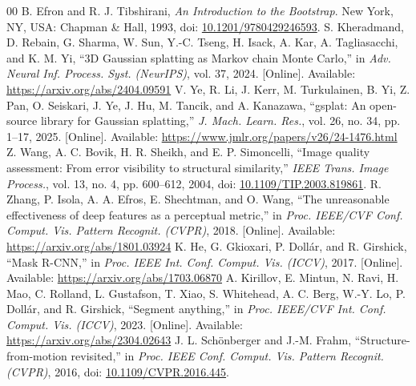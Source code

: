 \begin{thebibliography}{00}
 B. Efron and R. J. Tibshirani, \textit{An Introduction to the Bootstrap}. New York, NY, USA: Chapman \& Hall, 1993, doi: \href{https://doi.org/10.1201/9780429246593}{10.1201/9780429246593}.
 S. Kheradmand, D. Rebain, G. Sharma, W. Sun, Y.-C. Tseng, H. Isack, A. Kar, A. Tagliasacchi, and K. M. Yi, ``3D Gaussian splatting as Markov chain Monte Carlo,'' in \textit{Adv. Neural Inf. Process. Syst. (NeurIPS)}, vol. 37, 2024. [Online]. Available: \url{https://arxiv.org/abs/2404.09591}
 V. Ye, R. Li, J. Kerr, M. Turkulainen, B. Yi, Z. Pan, O. Seiskari, J. Ye, J. Hu, M. Tancik, and A. Kanazawa, ``gsplat: An open-source library for Gaussian splatting,'' \textit{J. Mach. Learn. Res.}, vol. 26, no. 34, pp. 1--17, 2025. [Online]. Available: \url{https://www.jmlr.org/papers/v26/24-1476.html}
 Z. Wang, A. C. Bovik, H. R. Sheikh, and E. P. Simoncelli, ``Image quality assessment: From error visibility to structural similarity,'' \textit{IEEE Trans. Image Process.}, vol. 13, no. 4, pp. 600--612, 2004, doi: \href{https://doi.org/10.1109/TIP.2003.819861}{10.1109/TIP.2003.819861}.
 R. Zhang, P. Isola, A. A. Efros, E. Shechtman, and O. Wang, ``The unreasonable effectiveness of deep features as a perceptual metric,'' in \textit{Proc. IEEE/CVF Conf. Comput. Vis. Pattern Recognit. (CVPR)}, 2018. [Online]. Available: \url{https://arxiv.org/abs/1801.03924}
 K. He, G. Gkioxari, P. Dollár, and R. Girshick, ``Mask R-CNN,'' in \textit{Proc. IEEE Int. Conf. Comput. Vis. (ICCV)}, 2017. [Online]. Available: \url{https://arxiv.org/abs/1703.06870}
 A. Kirillov, E. Mintun, N. Ravi, H. Mao, C. Rolland, L. Gustafson, T. Xiao, S. Whitehead, A. C. Berg, W.-Y. Lo, P. Dollár, and R. Girshick, ``Segment anything,'' in \textit{Proc. IEEE/CVF Int. Conf. Comput. Vis. (ICCV)}, 2023. [Online]. Available: \url{https://arxiv.org/abs/2304.02643}
 J. L. Schönberger and J.-M. Frahm, ``Structure-from-motion revisited,'' in \textit{Proc. IEEE Conf. Comput. Vis. Pattern Recognit. (CVPR)}, 2016, doi: \href{https://doi.org/10.1109/CVPR.2016.445}{10.1109/CVPR.2016.445}.
\end{thebibliography}
